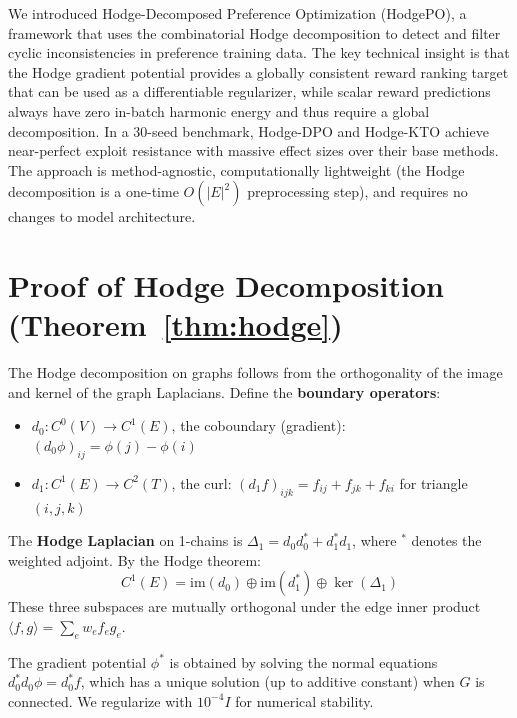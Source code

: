 \documentclass{article}
\begin{document}
We introduced Hodge-Decomposed Preference Optimization (HodgePO), a framework that uses the combinatorial Hodge decomposition to detect and filter cyclic inconsistencies in preference training data. The key technical insight is that the Hodge gradient potential provides a globally consistent reward ranking target that can be used as a differentiable regularizer, while scalar reward predictions always have zero in-batch harmonic energy and thus require a global decomposition. In a 30-seed benchmark, Hodge-DPO and Hodge-KTO achieve near-perfect exploit resistance with massive effect sizes over their base methods. The approach is method-agnostic, computationally lightweight (the Hodge decomposition is a one-time $O(|E|^2)$ preprocessing step), and requires no changes to model architecture.




\newpage
\appendix

\section{Proof of Hodge Decomposition (Theorem~\ref{thm:hodge})}
\label{app:hodge_proof}

The Hodge decomposition on graphs follows from the orthogonality of the image and kernel of the graph Laplacians. Define the \textbf{boundary operators}:
\begin{itemize}
    \item $d_0: C^0(V) \to C^1(E)$, the coboundary (gradient): $(d_0 \phi)_{ij} = \phi(j) - \phi(i)$
    \item $d_1: C^1(E) \to C^2(T)$, the curl: $(d_1 f)_{ijk} = f_{ij} + f_{jk} + f_{ki}$ for triangle $(i,j,k)$
\end{itemize}

The \textbf{Hodge Laplacian} on 1-chains is $\Delta_1 = d_0 d_0^* + d_1^* d_1$, where $^*$ denotes the weighted adjoint. By the Hodge theorem:
\begin{equation}
    C^1(E) = \text{im}(d_0) \oplus \text{im}(d_1^*) \oplus \ker(\Delta_1)
\end{equation}
These three subspaces are mutually orthogonal under the edge inner product $\langle f, g \rangle = \sum_e w_e f_e g_e$.

The gradient potential $\phi^*$ is obtained by solving the normal equations $d_0^* d_0 \phi = d_0^* f$, which has a unique solution (up to additive constant) when $G$ is connected. We regularize with $10^{-4} I$ for numerical stability.
\end{document}
